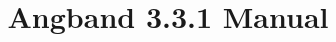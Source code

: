 \documentclass[a4paper]{article}
\begin{document}
\title{Angband 3.3.1 Manual}
\maketitle
\tableofcontents











\printindex
\end{document}
